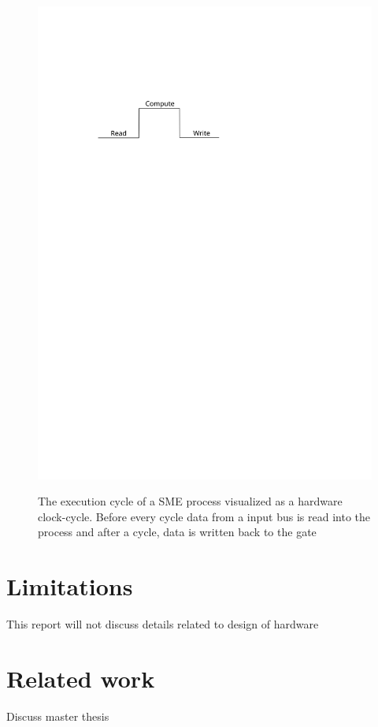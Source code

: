 \begin{figure}
\centering
\includegraphics{figures/execution-cycle}
\label{fig:cycle}
\caption[Execution flow of a SME-process]{The execution cycle of a
  SME process visualized as a hardware clock-cycle. Before every cycle
  data from a input bus is read into the process and after a cycle,
  data is written back to the gate}
\end{figure}


\section{Limitations}
This report will not discuss details related to design of hardware

\section{Related work}
Discuss master thesis

